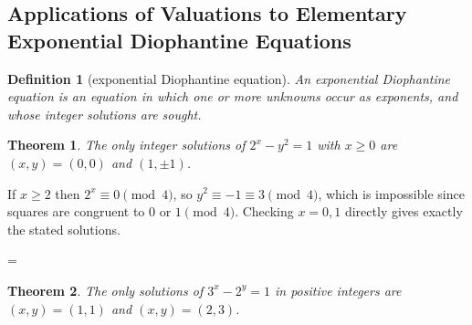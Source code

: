 \documentclass[11pt]{article}
\makeatletter
\theoremstyle{ntstyle}
\newtheorem{theorem}{Theorem}[subsection]
\newtheorem{definition}{Definition}[subsection]
\let\nt@closedisplay\]
\def\nt@guardedclose{\@ifnextchar\par{\nt@closeafterpar}{\@ifnextchar\end{\postdisplaypenalty\@M\nt@closedisplay}{\nt@closedisplay}}}
\def\nt@closeafterpar\par{\@ifnextchar\par{\nt@closeafterpar}{\@ifnextchar\end{\postdisplaypenalty\@M\nt@closedisplay\par}{\nt@closedisplay\par}}}
\renewenvironment{proof}[1][\proofname]{\par
  \pushQED{\qed}\normalfont\topsep\medskipamount\edef\nt@afterproof{\@endparpenalty=\the\@endparpenalty\relax}\@beginparpenalty\@M\@endparpenalty\@M\let\]\nt@guardedclose\trivlist\item[]\textit{#1\@addpunct{.}} \ignorespaces}{\ifvmode\addpenalty\@M\fi\popQED\nt@afterproof\endtrivlist\@endpefalse}
\makeatother
\begin{document}
\subsection{Applications of Valuations to Elementary Exponential Diophantine Equations}

\begin{definition}[exponential Diophantine equation]\label{def:4.9.1}
	An exponential Diophantine equation is an equation in which one or more unknowns occur as exponents, and whose integer solutions are sought.

\end{definition}
\begin{theorem}\label{thm:4.9.1}
	The only integer solutions of $2^x-y^2=1$ with $x\ge0$ are $(x,y)=(0,0)$
	and $(1,\pm1)$.

\end{theorem}

\begin{proof} If $x\ge2$ then $2^{x}\equiv0\pmod{4}$, so
	$y^{2}\equiv-1\equiv3\pmod{4}$, which is impossible since squares are
	congruent to $0$ or $1\pmod{4}$. Checking $x=0,1$ directly gives exactly the stated
	solutions.

\end{proof}
\begin{theorem}\label{thm:4.9.2}
	The only solutions of $3^x-2^y=1$ in positive integers are $(x,y)=(1,1)$
	and $(x,y)=(2,3)$.

\end{theorem}
\end{document}
